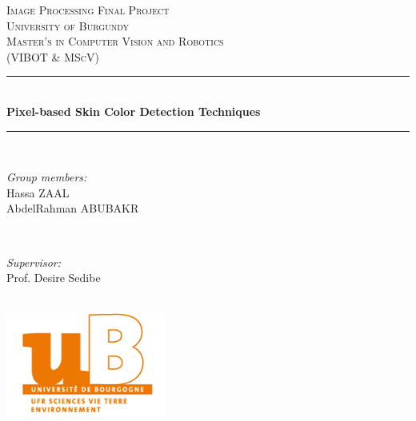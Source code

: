 \documentclass[12pt]{article} %
\begin{document}

\begin{titlepage}

\newcommand{\HRule}{\rule{\linewidth}{0.5mm}} %

\center %

\textsc{\LARGE Image Processing Final Project}\\[1cm] %
\textsc{\Large University of Burgundy}\\[0.8cm] %
\textsc{\large Master's in Computer Vision and Robotics}\\[0.5cm] %
\textsc{\large (VIBOT \& MScV)}\\[0.8cm] %

\HRule \\[0.8cm]
{ \huge \bfseries Pixel-based Skin Color Detection Techniques}\\[0.4cm] %
\HRule \\[2cm]

\begin{minipage}{0.5\textwidth}
\begin{flushleft} \large
\emph{Group members:}\\
 Hassa ZAAL \\
 AbdelRahman ABUBAKR\\

\end{flushleft}
\end{minipage}
~
\begin{minipage}{0.4\textwidth}
\begin{flushright} \large
\emph{Supervisor:} \\
Prof. Desire Sedibe  %
\end{flushright}
\end{minipage}\\[3 cm]


\includegraphics{Logo}\\[0cm] %


\end{titlepage}
\end{document}
